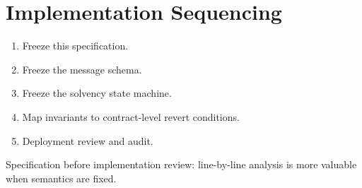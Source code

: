 \section{Implementation Sequencing}

\label{sec:sequencing}

\begin{enumerate}[nosep]
  \item Freeze this specification.
  \item Freeze the message schema.
  \item Freeze the solvency state machine.
  \item Map invariants to contract-level revert conditions.
  \item Deployment review and audit.
\end{enumerate}

Specification before implementation review: line-by-line analysis is more valuable when semantics are fixed.


